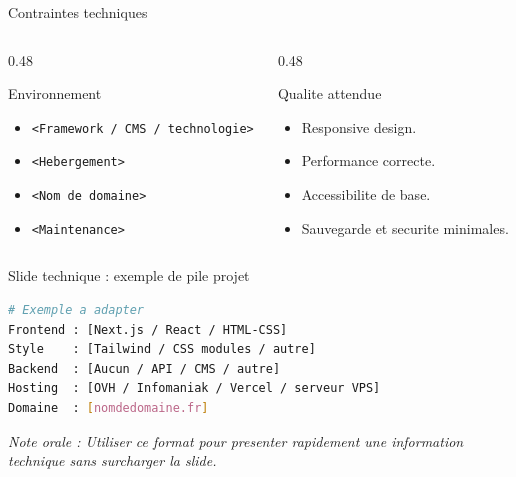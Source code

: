 \documentclass[aspectratio=169,11pt]{beamer}
\newcommand{\speakerhint}[1]{%
  \vspace{0.2cm}
  {\scriptsize\color{MutedText}\textit{Note orale : #1}}
}
\newcommand{\ph}[1]{{\color{MutedText}\texttt{<#1>}}}
\begin{document}
\begin{frame}{Contraintes techniques}
  \begin{columns}[T,onlytextwidth]
    \begin{column}{0.48\textwidth}
      \begin{block}{Environnement}
        \begin{itemize}
          \item \ph{Framework / CMS / technologie}
          \item \ph{Hebergement}
          \item \ph{Nom de domaine}
          \item \ph{Maintenance}
        \end{itemize}
      \end{block}
    \end{column}
    \begin{column}{0.48\textwidth}
      \begin{block}{Qualite attendue}
        \begin{itemize}
          \item Responsive design.
          \item Performance correcte.
          \item Accessibilite de base.
          \item Sauvegarde et securite minimales.
        \end{itemize}
      \end{block}
    \end{column}
  \end{columns}
\end{frame}

\begin{frame}[fragile]{Slide technique : exemple de pile projet}
  \begin{lstlisting}[language=bash]
# Exemple a adapter
Frontend : [Next.js / React / HTML-CSS]
Style    : [Tailwind / CSS modules / autre]
Backend  : [Aucun / API / CMS / autre]
Hosting  : [OVH / Infomaniak / Vercel / serveur VPS]
Domaine  : [nomdedomaine.fr]
  \end{lstlisting}
  \speakerhint{Utiliser ce format pour presenter rapidement une information technique sans surcharger la slide.}
\end{frame}
\end{document}
